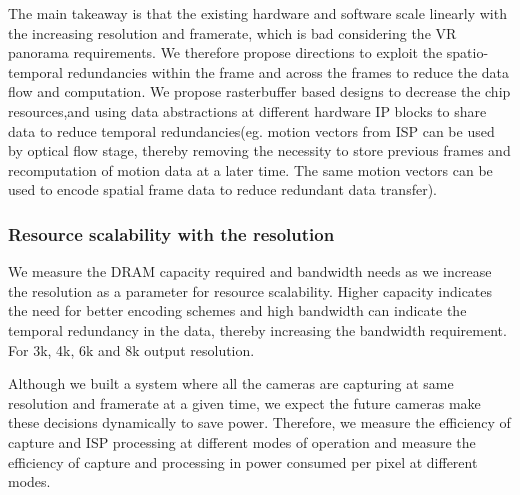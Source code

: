The main takeaway is that the existing hardware and software scale linearly with the increasing resolution and framerate, which is bad considering the VR panorama requirements. We therefore propose directions to exploit the spatio-temporal redundancies within the frame and across the frames to reduce the data flow and computation. We propose rasterbuffer based designs to decrease the chip resources,and using data abstractions at different hardware IP blocks to share data to reduce temporal redundancies(eg. motion vectors from ISP can be used by optical flow stage, thereby removing the necessity to store previous frames and recomputation of motion data at a later time. The same motion vectors can be used to encode spatial frame data to reduce redundant data transfer).

\subsubsection{Resource scalability with the resolution}
We measure the DRAM capacity required and bandwidth needs as we increase the resolution as a parameter for resource scalability. Higher capacity indicates the need for better encoding schemes and high bandwidth can indicate the temporal redundancy in the data, thereby increasing the bandwidth requirement. For 3k, 4k, 6k and 8k output resolution.

Although we built a system where all the cameras are capturing at same resolution and framerate at a given time, we expect the future cameras make these decisions dynamically to save power. Therefore, we  measure the efficiency of capture and ISP processing at different modes of operation and measure the efficiency of capture and processing in power consumed per pixel at different modes.

